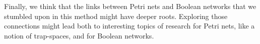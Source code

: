 \documentclass[preprint,12pt]{elsarticle}
\begin{document}
Finally, we think that the links between Petri nets and Boolean networks that we stumbled upon in this method might have deeper roots. Exploring those connections might lead both to interesting topics of research for Petri nets, like a notion of trap-spaces, and for Boolean networks.




 






\end{document}
